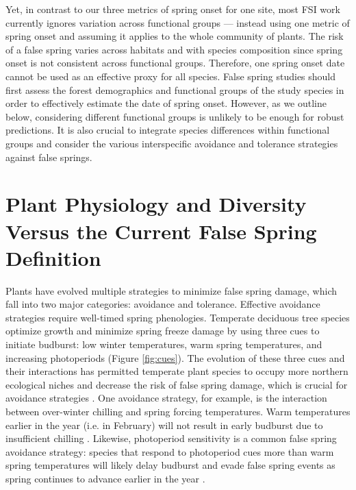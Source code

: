 \documentclass{article}\usepackage[]{graphicx}\usepackage[]{color}
\begin{document}
Yet, in contrast to our three metrics of spring onset for one site, most FSI work currently ignores variation across functional groups --- instead using one metric of spring onset and assuming it applies to the whole community of plants. The risk of a false spring varies across habitats and with species composition since spring onset is not consistent across functional groups. Therefore, one spring onset date cannot be used as an effective proxy for all species. False spring studies should first assess the forest demographics and functional groups of the study species in order to effectively estimate the date of spring onset. However, as we outline below, considering different functional groups is unlikely to be enough for robust predictions. It is also crucial to integrate species differences within functional groups and consider the various interspecific avoidance and tolerance strategies against false springs. %

\section {Plant Physiology and Diversity Versus the Current False Spring Definition}
Plants have evolved multiple strategies to minimize false spring damage, which fall into two major categories: avoidance and tolerance. Effective avoidance strategies require well-timed spring phenologies. Temperate deciduous tree species optimize growth and minimize spring freeze damage by using three cues to initiate budburst: low winter temperatures, warm spring temperatures, and increasing photoperiods \citep{Cleland2007, Polgar2011} (Figure \ref{fig:cues}). The evolution of these three cues and their interactions has permitted temperate plant species to occupy more northern ecological niches and decrease the risk of false spring damage, which is crucial for avoidance strategies \citep{Samish1954}. One avoidance strategy, for example, is the interaction between over-winter chilling and spring forcing temperatures. Warm temperatures earlier in the year (i.e. in February) will not result in early budburst due to insufficient chilling \citep{Basler2012}. Likewise, photoperiod sensitivity is a common false spring avoidance strategy: species that respond to photoperiod cues more than warm spring temperatures will likely delay budburst and evade false spring events as spring continues to advance earlier in the year \citep{Basler2014}. 
\end{document}
